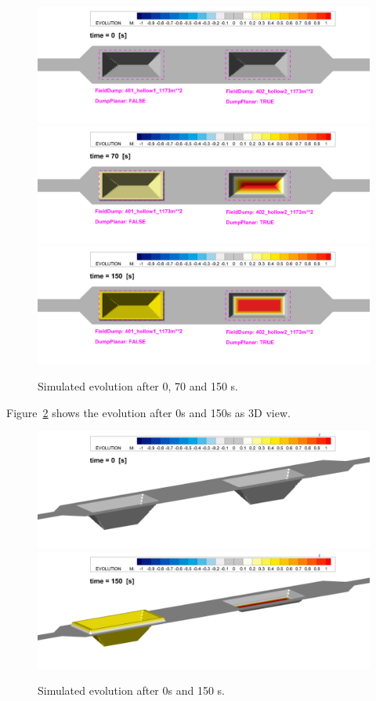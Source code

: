\begin{figure} [!h]
\centering
\includegraphics[scale=0.14]{result000_zoom.png}
\includegraphics[scale=0.14]{result070_zoom.png}
\includegraphics[scale=0.14]{result150_zoom.png}
\caption{Simulated evolution after 0, 70 and 150 s.}\label{result50}
\end{figure}

Figure~\ref{result3D} shows the evolution after 0s and 150s as 3D view.
\begin{figure} [!h]
\centering
\includegraphics[scale=0.14]{result000_zoom3D.png}
\includegraphics[scale=0.14]{result150_zoom3D.png}
\caption{Simulated evolution after 0s and 150 s.}\label{result3D}
\end{figure}


